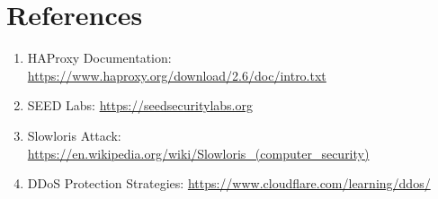 \documentclass[12pt]{article}
\begin{document}
\section{References}

\begin{enumerate}
    \item HAProxy Documentation: \url{https://www.haproxy.org/download/2.6/doc/intro.txt}
    \item SEED Labs: \url{https://seedsecuritylabs.org}
    \item Slowloris Attack: \url{https://en.wikipedia.org/wiki/Slowloris_(computer_security)}
    \item DDoS Protection Strategies: \url{https://www.cloudflare.com/learning/ddos/}
\end{enumerate}
\end{document}

